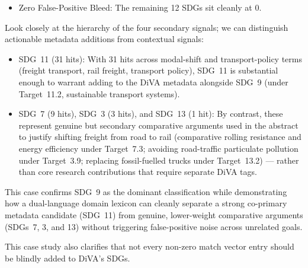 \begin{casestudySection}
\begin{itemize}
\begin{itemize}
        \item \gls{SDG}~3 (\num{3} hits): Accurately flags the health comparison regarding road-traffic particulate pollution (\enquote{particulate emissions}: 1, \enquote{\foreignlanguage{swedish}{partikelutsläpp}}: 1, \enquote{health}: 1).
        
        \item \gls{SDG}~13 (\num{1} hit): Trace hit on \enquote{fossil-fuel}.
    \end{itemize}
    
    \item Zero False-Positive Bleed: The remaining \num{12} \glspl{SDG} sit cleanly at \num{0}.
\end{itemize}

Look closely at the hierarchy of the four secondary signals; we can distinguish actionable metadata additions from contextual signals:
\begin{itemize}
    \item \gls{SDG}~11 (\num{31} hits): With \num{31} hits across modal-shift and transport-policy terms (freight transport, rail freight, transport policy), \gls{SDG}~11 is substantial enough to warrant adding to the \gls{DiVA} metadata alongside \gls{SDG}~9 (under Target~11.2, sustainable transport systems).

    \item \gls{SDG}~7 (\num{9} hits), \gls{SDG}~3 (\num{3} hits), and \gls{SDG}~13 (\num{1} hit): By contrast, these represent genuine but secondary comparative arguments used in the abstract to justify shifting freight from road to rail (comparative rolling resistance and energy efficiency under Target~7.3; avoiding road-traffic particulate pollution under Target~3.9; replacing fossil-fuelled trucks under Target~13.2) --- rather than core research contributions that require separate \gls{DiVA} tags.
\end{itemize}
\end{casestudySection}

\begin{takeaway}
This case confirms \gls{SDG}~9 as the dominant classification while demonstrating how a dual-language domain lexicon can cleanly separate a strong co-primary metadata candidate (\gls{SDG}~11) from genuine, lower-weight comparative arguments (\glspl{SDG}~7, 3, and 13) without triggering false-positive noise across unrelated goals.
\medskip

This case study also clarifies that not every non-zero match vector entry should be blindly added to \gls{DiVA}'s \glspl{SDG}.
\end{takeaway}


